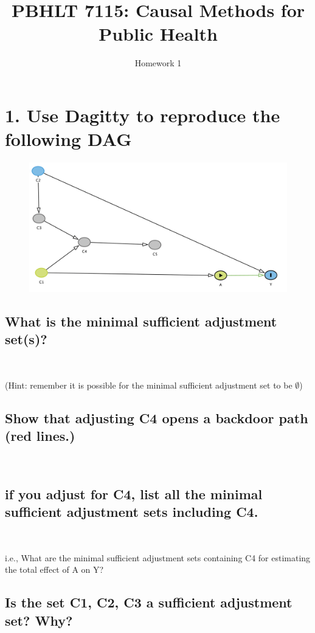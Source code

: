 \documentclass[11pt]{amsart}
\title{PBHLT 7115: Causal Methods for Public Health }
\author{Homework 1}
\date{} %
\begin{document}
\maketitle

\section{1. Use Dagitty to reproduce the following DAG}

\begin{figure}[h]
\centering
\includegraphics[scale=0.4]{DAG.png}
\end{figure}


\newpage

\subsection{What is the minimal sufficient adjustment set(s)?}\

(Hint: remember it is possible for the minimal sufficient adjustment set to be $\emptyset$)

\vspace{4cm}

\subsection{Show that adjusting C4 opens a backdoor path (red lines.) }\

\vspace{4cm}

\subsection{if you adjust for C4, list all the minimal sufficient adjustment sets including C4.}\

i.e., What are the minimal sufficient adjustment sets containing C4 for estimating the total effect of A on Y?


\vspace{4cm}

\subsection{Is the set {C1, C2, C3}  a sufficient adjustment set? Why? }
\end{document}
